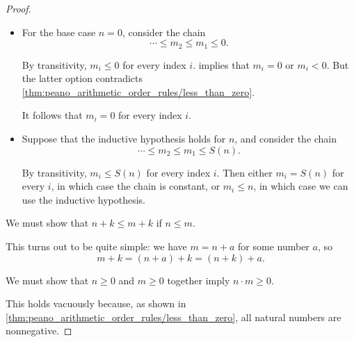 \begin{proof}
  \begin{itemize}
    \item For the base case \( n = 0 \), consider the chain
    \begin{equation*}
      \cdots \leq m_2 \leq m_1 \leq 0.
    \end{equation*}

    By transitivity, \( m_i \leq 0 \) for every index \( i \).  implies that \( m_i = 0 \) or \( m_i < 0 \). But the latter option contradicts \cref{thm:peano_arithmetic_order_rules/less_than_zero}.

    It follows that \( m_i = 0 \) for every index \( i \).

    \item Suppose that the inductive hypothesis holds for \( n \), and consider the chain
    \begin{equation*}
      \cdots \leq m_2 \leq m_1 \leq S(n).
    \end{equation*}

    By transitivity, \( m_i \leq S(n) \) for every index \( i \). Then either \( m_i = S(n) \) for every \( i \), in which case the chain is constant, or \( m_i \leq n \), in which case we can use the inductive hypothesis.
  \end{itemize}

   We must show that \( n + k \leq m + k \) if \( n \leq m \).

  This turns out to be quite simple: we have \( m = n + a \) for some number \( a \), so
  \begin{equation*}
    m + k = (n + a) + k = (n + k) + a.
  \end{equation*}

   We must show that \( n \geq 0 \) and \( m \geq 0 \) together imply \( n \cdot m \geq 0 \).

  This holds vacuously because, as shown in \cref{thm:peano_arithmetic_order_rules/less_than_zero}, all natural numbers are nonnegative.
\end{proof}

